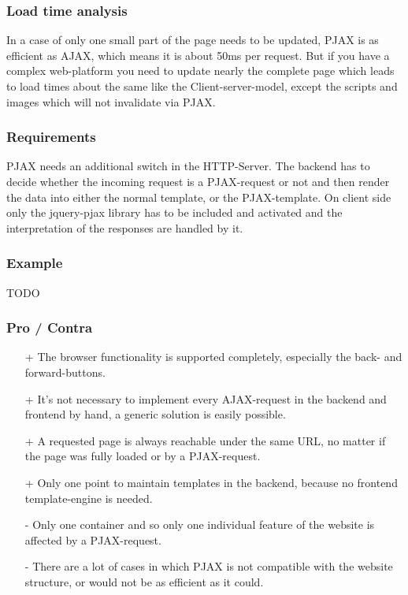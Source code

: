 \documentclass[f,bachelor,binding,twoside,palatino]{WeSTthesis}
\def \ajax {AJAX}
\def \pjax {PJAX}
\def \pjaxRequest {PJAX-request}
\begin{document}
    \subsubsection{Load time analysis}
      In a case of only one small part of the page needs to be updated, \pjax{} is as efficient as \ajax{}, which means it is about 50ms per request.
      But if you have a complex web-platform you need to update nearly the complete page which leads to load times about the same like the Client-server-model, except the scripts and images which will not invalidate via \pjax{}.
    
    \subsubsection{Requirements}
    \pjax{} needs an additional switch in the HTTP-Server.
    The backend has to decide whether the incoming request is a \pjaxRequest{} or not and then render the data into either the normal template, or the \pjax{}-template.
    On client side only the jquery-pjax library has to be included and activated and the interpretation of the responses are handled by it.

    \subsubsection{Example}
    TODO

    \subsubsection{Pro / Contra}
      \begin{itemize}
  	    \item[+]{The browser functionality is supported completely, especially the back- and forward-buttons.}
  	    \item[+]{It's not necessary to implement every \ajax{}-request in the backend and frontend by hand, a generic solution is easily possible.}
  	    \item[+]{A requested page is always reachable under the same URL, no matter if the page was fully loaded or by a \pjaxRequest{}.}
  	    \item[+]{Only one point to maintain templates in the backend, because no frontend template-engine is needed.}
  	    \item[-]{Only one container and so only one individual feature of the website is affected by a \pjaxRequest{}.}
  	    \item[-]{There are a lot of cases in which \pjax{} is not compatible with the website structure, or would not be as efficient as it could.}
      \end{itemize}
\end{document}
